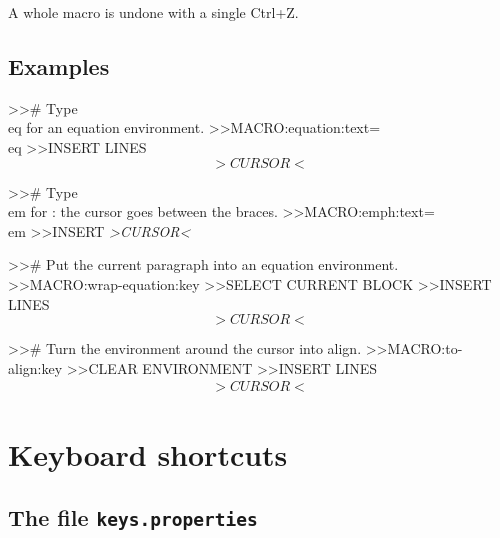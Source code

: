 \documentclass[11pt]{article}
\newcommand{\key}[1]{\textsf{#1}}
\newcommand{\file}[1]{\texttt{#1}}
\begin{document}
    A whole macro is undone with a single \key{Ctrl+Z}.

    \subsection{Examples}

    \begin{Code}
>># Type \\eq for an equation environment.
>>MACRO:equation:text=\\eq
>>INSERT LINES
\begin{equation}
    >CURSOR<
\end{equation}

>># Type \\em for \emph{}: the cursor goes between the braces.
>>MACRO:emph:text=\\em
>>INSERT \emph{>CURSOR<}

>># Put the current paragraph into an equation environment.
>>MACRO:wrap-equation:key
>>SELECT CURRENT BLOCK
>>INSERT LINES
\begin{equation}
    >CURSOR<
\end{equation}

>># Turn the environment around the cursor into align.
>>MACRO:to-align:key
>>CLEAR ENVIRONMENT
>>INSERT LINES
\begin{align}
    >CURSOR<
\end{align}
    \end{Code}


    \section{Keyboard shortcuts}\label{sec:keys}

    \subsection{The file \file{keys.properties}}
\end{document}
